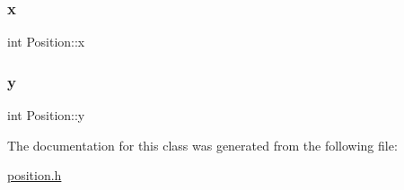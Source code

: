 \subsubsection{\texorpdfstring{x}{x}}
{\footnotesize\ttfamily int Position\+::x}

\mbox{\label{class_position_a3c08e9213d4726b21caba3073192c4a3}} 
\subsubsection{\texorpdfstring{y}{y}}
{\footnotesize\ttfamily int Position\+::y}



The documentation for this class was generated from the following file\+:\begin{DoxyCompactItemize}
\item 
\mbox{\hyperlink{position_8h}{position.\+h}}\end{DoxyCompactItemize}
